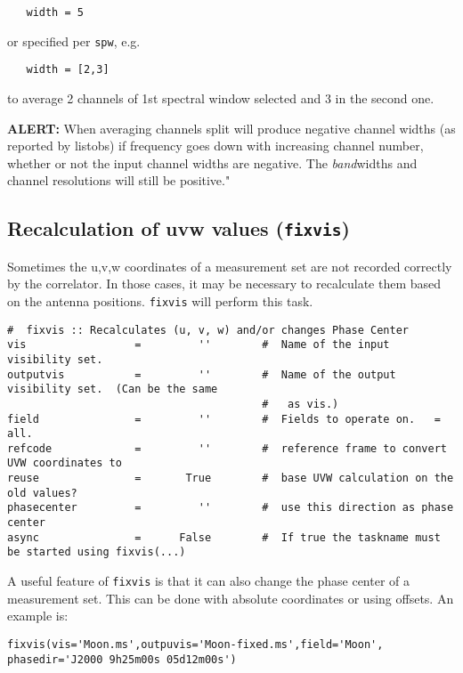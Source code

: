 \small
\begin{verbatim}
   width = 5
\end{verbatim}
\normalsize

or specified per {\tt spw}, e.g.

\small
\begin{verbatim}
   width = [2,3]
\end{verbatim}
\normalsize

to average 2 channels of 1st spectral window selected and 3 in the 
second one.


{\bf ALERT:} When averaging channels split will produce negative channel widths
(as reported by listobs) if frequency goes down with increasing channel
number, whether or not the input channel widths are negative.  The
\emph{band}widths and channel resolutions will still be positive."


\subsection{Recalculation of uvw values ({\tt fixvis})}
\label{section:cal.other.fixvis}

Sometimes the u,v,w coordinates of a measurement set are not recorded
correctly by the correlator. In those cases, it may be necessary to
recalculate them based on the antenna positions. {\tt fixvis} will
perform this task.


\small
\begin{verbatim}
#  fixvis :: Recalculates (u, v, w) and/or changes Phase Center 
vis                 =         ''        #  Name of the input visibility set.
outputvis           =         ''        #  Name of the output visibility set.  (Can be the same
                                        #   as vis.)
field               =         ''        #  Fields to operate on.   = all.
refcode             =         ''        #  reference frame to convert UVW coordinates to
reuse               =       True        #  base UVW calculation on the old values?
phasecenter         =         ''        #  use this direction as phase center
async               =      False        #  If true the taskname must be started using fixvis(...)
\end{verbatim}
\normalsize

A useful feature of {\tt fixvis} is that it can also change the phase
center of a measurement set. This can be done with absolute coordinates
or using offsets. An example is:
\small
\begin{verbatim}
fixvis(vis='Moon.ms',outpuvis='Moon-fixed.ms',field='Moon', phasedir='J2000 9h25m00s 05d12m00s')
\end{verbatim}
\normalsize

